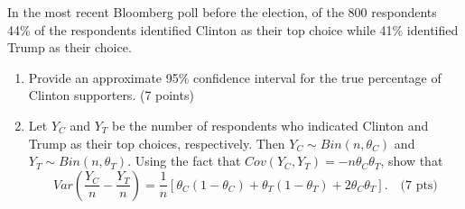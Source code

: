 

\item In the most recent Bloomberg poll before the election, of the 800 
respondents 44\% of the respondents identified Clinton as their top choice 
while 41\% identified Trump as their choice. 

\begin{enumerate}
\item Provide an approximate 95\% confidence interval for the true percentage of 
Clinton supporters. (7 points)

\vfill
% 
% 

\item Let $Y_C$ and $Y_T$ be the number of respondents who indicated Clinton 
and Trump as their top choices, respectively. Then $Y_C \sim Bin(n,\theta_C)$ 
and $Y_T \sim Bin(n,\theta_T)$. Using the fact that 
$Cov(Y_C,Y_T) = -n\theta_C \theta_T$, show that 
\[
Var\left( \frac{Y_C}{n} - \frac{Y_T}{n}\right) = 
\frac{1}{n}\left[ \theta_C(1 - \theta_C) + \theta_T(1-\theta_T) + 2\theta_C\theta_T \right]. \quad \mbox{(7 pts)}
\]

\ansfont{
\[ \begin{array}{rl}
Var\left( \frac{Y_C}{n} - \frac{Y_T}{n}\right) 
&= \frac{1}{n^2}Var(Y_C-Y_T) \\
&= \frac{1}{n^2}\left[ Var(Y_C)+Var(Y_T)-2Cov(Y_C,Y_T) \right] \\
&= \frac{1}{n^2}\left[ n\theta_C(1-\theta_C)+n\theta_T(1-\theta_T)+2n\theta_C \theta_T \right] \\
&= \frac{1}{n}\left[ \theta_C(1 - \theta_C) + \theta_T(1-\theta_T) + 2\theta_C\theta_T \right]
\end{array} \]
}


\end{enumerate}
